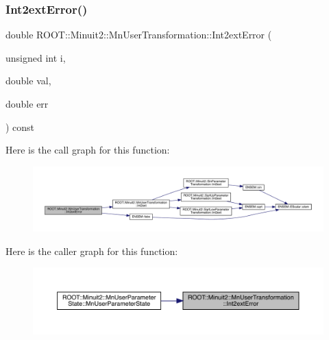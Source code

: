\subsubsection{\texorpdfstring{Int2extError()}{Int2extError()}\hspace{0.1cm}{\footnotesize\ttfamily [1/3]}}
{\footnotesize\ttfamily double R\+O\+O\+T\+::\+Minuit2\+::\+Mn\+User\+Transformation\+::\+Int2ext\+Error (\begin{DoxyParamCaption}\item[{unsigned int}]{i,  }\item[{double}]{val,  }\item[{double}]{err }\end{DoxyParamCaption}) const}

Here is the call graph for this function\+:
\nopagebreak
\begin{figure}[H]
\begin{center}
\leavevmode
\includegraphics[width=350pt]{d9/d98/classROOT_1_1Minuit2_1_1MnUserTransformation_ad900f367f4d2c5df13f899dd55bdf212_cgraph}
\end{center}
\end{figure}
Here is the caller graph for this function\+:
\nopagebreak
\begin{figure}[H]
\begin{center}
\leavevmode
\includegraphics[width=350pt]{d9/d98/classROOT_1_1Minuit2_1_1MnUserTransformation_ad900f367f4d2c5df13f899dd55bdf212_icgraph}
\end{center}
\end{figure}
\mbox{\label{classROOT_1_1Minuit2_1_1MnUserTransformation_ad900f367f4d2c5df13f899dd55bdf212}} 
